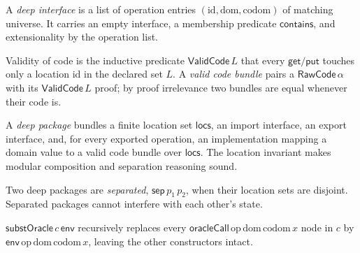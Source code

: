 \begin{definition}
  \label{def:deepinterface}
  \leanok
  A \emph{deep interface} is a list of operation entries $(\mathrm{id}, \mathrm{dom},
  \mathrm{codom})$ of matching universe. It carries an empty interface, a
  membership predicate $\mathsf{contains}$, and extensionality by the operation
  list.
\end{definition}

\begin{definition}
  \label{def:validcodebundle}
  \leanok
  Validity of code is the inductive predicate $\mathsf{ValidCode}\,L$ that every
  $\mathsf{get}/\mathsf{put}$ touches only a location id in the declared set
  $L$. A \emph{valid code bundle} pairs a $\mathsf{RawCode}\,\alpha$ with its
  $\mathsf{ValidCode}\,L$ proof; by proof irrelevance two bundles are equal
  whenever their code is.
\end{definition}

\begin{definition}
  \label{def:deeppackage}
  \leanok
  A \emph{deep package} bundles a finite location set $\mathsf{locs}$, an
  import interface, an export interface, and, for every exported operation, an
  implementation mapping a domain value to a valid code bundle over
  $\mathsf{locs}$. The location invariant makes modular composition and
  separation reasoning sound.
\end{definition}

\begin{definition}[Separation]
  \label{def:deeppackage-sep}
  \leanok
  Two deep packages are \emph{separated}, $\mathsf{sep}\,p_1\,p_2$, when their
  location sets are disjoint. Separated packages cannot interfere with each
  other's state.
\end{definition}

\begin{definition}
  \label{def:substoracle}
  \leanok
  $\mathsf{substOracle}\,c\,\mathsf{env}$ recursively replaces every
  $\mathsf{oracleCall}\,\mathrm{op}\,\mathrm{dom}\,\mathrm{codom}\,x$ node in
  $c$ by $\mathsf{env}\,\mathrm{op}\,\mathrm{dom}\,\mathrm{codom}\,x$, leaving
  the other constructors intact.
\end{definition}

